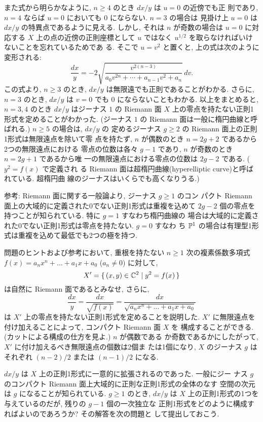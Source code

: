\documentclass[12pt,twoside]{jarticle}
\def\C{{\Bbb C}} %
\def\P{{\Bbb P}}
\begin{document}
また式から明らかなように, $n\ge4$ のとき $dx/y$ は $u=0$ の近傍でも正
則であり, $n=4$ ならば $u=0$ においても $0$ にならない. $n=3$ の場合は
見掛け上 $u=0$ は $dx/y$ の特異点であるように見える. しかし, それは 
$n$ が奇数の場合は $u=0$ に対応する $X$ 上の点の近傍の正則座標として %
$u$ ではなく $u^{1/2}$ を取らなければいけないことを忘れているためであ
る. そこで $u=v^2$ と置くと, 上の式は次のように変形される:
\[
  \frac{dx}{y}
  = -2 \sqrt{\frac{v^{2(n-3)}}{a_0v^{2n}+\cdots+a_{n-1}v^2+a_n}}\,dv.
\]
この式より, $n\ge 3$ のとき, $dx/y$ は無限遠でも正則であることがわかる.
さらに, $n=3$ のとき, $dx/y$ は $v=0$ でも $0$ にならないこともわかる.
以上をまとめると, $n=3,4$ のとき $dx/y$ はジーナス $1$ の Riemann 面 %
$X$ 上の零点を持たない正則1形式を定めることがわかった. (ジーナス $1$ 
の Riemann 面は一般に楕円曲線と呼ばれる.) $n\ge5$ の場合は, $dx/y$ の
定めるジーナス $g\ge2$ の Riemann 面上の正則1形式は無限遠点を除いて零
点を持たず, $n$ が偶数のとき $n=2g+2$ であるから2つの無限遠点における
零点の位数は各々 $g-1$ であり, $n$ が奇数のとき $n=2g+1$ であるから唯
一の無限遠点における零点の位数は $2g-2$ である. ($y^2=f(x)$ で定義され
る Riemann 面は超楕円曲線(hyperelliptic curve)と呼ばれている. 超楕円曲
線のジーナスはいくらでも高くなりうる.)

\medskip

\noindent 参考: Riemann 面に関する一般論より, ジーナス $g\ge 1$ のコン
パクト Riemann 面上の大域的に定義された0でない正則1形式は重複を込めて %
$2g-2$ 個の零点を持つことが知られている. 特に $g=1$ すなわち楕円曲線の
場合は大域的に定義された0でない正則1形式は零点を持たない. $g=0$ すなわ
ち $\P^1$ の場合は有理型1形式は重複を込めて最低でも2つの極を持つ.

\bigskip

問題のヒントおよび参考において, 重根を持たない $n\ge1$ 
次の複素係数多項式 $f(x)=a_nx^n+\dots+a_1x+a_0$ ($a_n\ne0$) に対して,
\[
  X' = \{\, (x,y)\in\C^2 \mid y^2 = f(x) \,\}
\]
は自然に Riemann 面であるとみなせ, さらに, 
\[
  \frac{dx}{y}
  = \frac{dx}{\sqrt{f(x)}}
  = \frac{dx}{\sqrt{a_n x^n + \dots + a_1x+a_0}}
\] %
は $X'$ 上の零点を持たない正則1形式を定めることを説明した. %
$X'$ に無限遠点を付け加えることによって, コンパクト Riemann 面 $X$ を
構成することができる. (カットによる構成の仕方を見よ.) $n$ が偶数である
か奇数であるかにしたがって, $X'$ に付け加えるべき無限遠点の個数は2個ま
たは1個になり, $X$ のジーナス $g$ はそれぞれ $(n-2)/2$ または %
$(n-1)/2$ になる.

$dx/y$ は $X$ 上の正則1形式に一意的に拡張されるのであった. 一般にジー
ナス $g$ のコンパクト Riemann 面上大域的に正則な正則1形式の全体のなす
空間の次元は $g$ になることが知られている. $g\ge1$ のとき, $dx/y$ は %
$X$ 上の正則1形式の1つを与えているのだが, 残りの $g-1$ 個の一次独立な
正則1形式をどのように構成すればよいのであろうか? その解答を次の問題と
して提出しておこう. 
\end{document}
